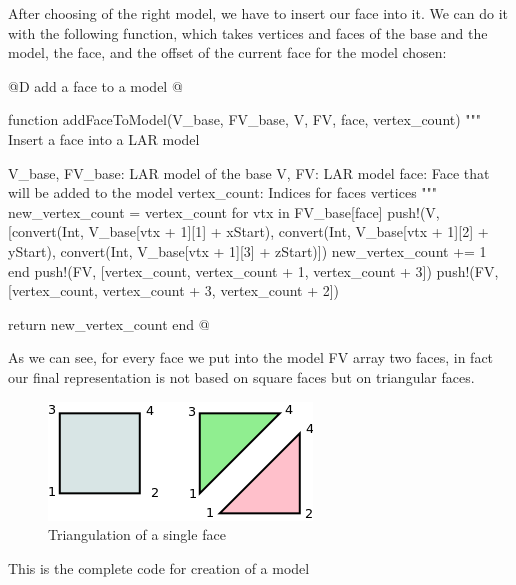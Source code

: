\documentclass[11pt,oneside]{article}	%
\begin{document}
After choosing of the right model, we have to insert our face into it. We can do it with the following function, which takes vertices and faces of the base and the model, the face, and the offset of the current face for the model chosen:

@D add a face to a model
@{function addFaceToModel(V_base, FV_base, V, FV, face, vertex_count)
  """
  Insert a face into a LAR model

  V_base, FV_base: LAR model of the base
  V, FV: LAR model
  face: Face that will be added to the model
  vertex_count: Indices for faces vertices
  """
  new_vertex_count = vertex_count
  for vtx in FV_base[face]
    push!(V, [convert(Int, V_base[vtx + 1][1] + xStart),
		    convert(Int, V_base[vtx + 1][2] + yStart),
		    convert(Int, V_base[vtx + 1][3] + zStart)])
    new_vertex_count += 1
  end
  push!(FV, [vertex_count, vertex_count + 1, vertex_count + 3])
  push!(FV, [vertex_count, vertex_count + 3, vertex_count + 2])

  return new_vertex_count
end @}

As we can see, for every face we put into the model FV array two faces, in fact our final representation is not based on square faces but on triangular faces.

\begin{figure}[htb] %
   \centering
   \includegraphics[width=0.40\linewidth]{images/Triangulation.png}
   \caption{Triangulation of a single face}
   \label{fig:Triangulation}
\end{figure}

This is the complete code for creation of a model
\end{document}
